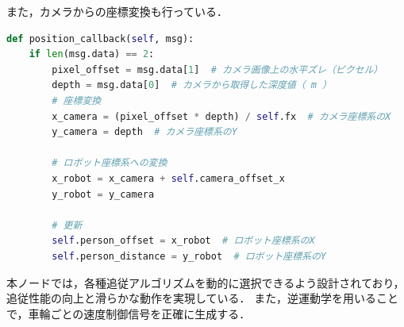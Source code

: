 また，カメラからの座標変換も行っている．
\begin{lstlisting}[language=Python, caption=座標変換]
def position_callback(self, msg):
    if len(msg.data) == 2:  
        pixel_offset = msg.data[1]  # カメラ画像上の水平ズレ（ピクセル）
        depth = msg.data[0]  # カメラから取得した深度値（ m ）
        # 座標変換
        x_camera = (pixel_offset * depth) / self.fx  # カメラ座標系のX
        y_camera = depth  # カメラ座標系のY

        # ロボット座標系への変換
        x_robot = x_camera + self.camera_offset_x
        y_robot = y_camera

        # 更新
        self.person_offset = x_robot  # ロボット座標系のX
        self.person_distance = y_robot  # ロボット座標系のY
\end{lstlisting}

本ノードでは，各種追従アルゴリズムを動的に選択できるよう設計されており，追従性能の向上と滑らかな動作を実現している．
また，逆運動学を用いることで，車輪ごとの速度制御信号を正確に生成する．
